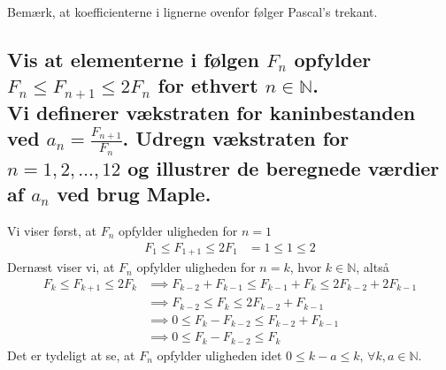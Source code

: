 \documentclass[11pt,a4paper]{article}
\begin{document}
Bemærk, at koefficienterne i lignerne ovenfor følger Pascal's trekant.

\subsection
{
    \mdseries
    Vis at elementerne i følgen ${F_n}$ opfylder $F_n \leq F_{n+1} \leq 2F_n$
    for ethvert $n \in \mathbb{N}$.
    \\\indent
    Vi definerer vækstraten for kaninbestanden ved $a_n =
    \frac{F_{n+1}}{F_n}$. Udregn vækstraten for $n = 1, 2, \dots, 12$ og
    illustrer de beregnede værdier af $a_n$ ved brug Maple.
}
Vi viser først, at $F_n$ opfylder uligheden for $n=1$
\begin{align}
    F_1 \leq F_{1+1} \leq 2F_1 &= 1 \leq 1 \leq 2
\end{align}
Dernæst viser vi, at $F_n$ opfylder uligheden for $n=k$, hvor $k \in
\mathbb{N}$, altså
\begin{align}
    F_k \leq F_{k+1} \leq 2F_k
    &\implies
    F_{k-2} + F_{k-1} \leq F_{k-1} + F_{k} \leq 2F_{k-2} + 2F_{k-1} \\
    &\implies
    F_{k-2} \leq F_{k} \leq 2F_{k-2} + F_{k-1} \\
    &\implies
    0 \leq F_{k} - F_{k-2} \leq F_{k-2} + F_{k-1} \\
    &\implies
    0 \leq F_{k} - F_{k-2} \leq F_{k}
\end{align}
Det er tydeligt at se, at $F_n$ opfylder uligheden idet $0 \leq k - a \leq k$,
$\forall k, a \in \mathbb{N}$.
\end{document}
